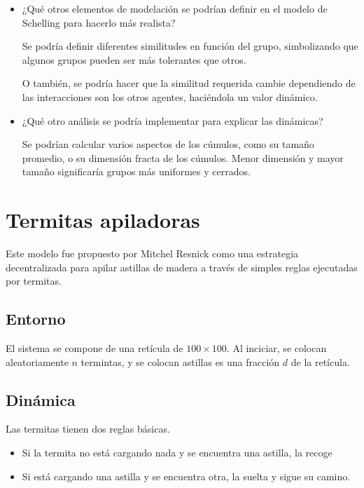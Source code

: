 \documentclass{article}
\begin{document}
\begin{itemize}
  \item¿Qué otros elementos de modelación se podrían definir en el modelo de
    Schelling para hacerlo más realista?

    Se podría definir diferentes similitudes en función del grupo, simbolizando
    que algunos grupos pueden ser más tolerantes que otros.

    O también, se podría hacer que la similitud requerida cambie dependiendo de
    las interacciones son los otros agentes, haciéndola un valor dinámico.

  \item ¿Qué otro análisis se podría implementar para explicar las dinámicas?

    Se podrían calcular varios aspectos de los cúmulos, como su tamaño promedio,
    o su dimensión fracta de los cúmulos. Menor
    dimensión y mayor tamaño significaría grupos más uniformes y cerrados.
\end{itemize}

\section{Termitas apiladoras}

Este modelo fue propuesto por Mitchel Resnick \cite{10.5555/184223} como una
estrategia decentralizada para apilar astillas de madera a través de simples
reglas ejecutadas por termitas.

\subsection{Entorno}

El sistema se compone de una retícula de $100 \times 100$. Al inciciar, se
colocan aleatoriamente $n$ termintas, y se colocan astillas es una fracción $d$
de la retícula.

\subsection{Dinámica}

Las termitas tienen dos reglas básicas.

\begin{itemize}
  \item Si la termita no está cargando nada y se encuentra una astilla, la
    recoge
  \item Si está cargando una astilla y se encuentra otra, la suelta y sigue su
    camino.
\end{itemize}
\end{document}
